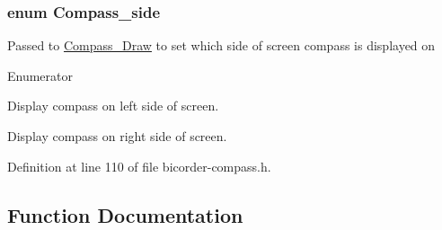 \subsubsection[{\texorpdfstring{Compass\+\_\+side}{Compass_side}}]{\setlength{\rightskip}{0pt plus 5cm}enum {\bf Compass\+\_\+side}}\hypertarget{bicorder-compass_8h_a7e36843c53aaafda9795876e659ffe7b}{}\label{bicorder-compass_8h_a7e36843c53aaafda9795876e659ffe7b}
Passed to \hyperlink{bicorder-compass_8h_a0ae721c1c17301cdf28bd0668a4f90af}{Compass\+\_\+\+Draw} to set which side of screen compass is displayed on \begin{Desc}
\item[Enumerator]\par
\begin{description}
\item[{\em 
C\+O\+M\+P\+A\+S\+S\+\_\+\+L\+E\+FT\hypertarget{bicorder-compass_8h_a7e36843c53aaafda9795876e659ffe7ba15cd36c342feb4b23e9a69bda67bcca8}{}\label{bicorder-compass_8h_a7e36843c53aaafda9795876e659ffe7ba15cd36c342feb4b23e9a69bda67bcca8}
}]Display compass on left side of screen. \item[{\em 
C\+O\+M\+P\+A\+S\+S\+\_\+\+R\+I\+G\+HT\hypertarget{bicorder-compass_8h_a7e36843c53aaafda9795876e659ffe7ba61001c6c8cf0fa674b3039da44c1b005}{}\label{bicorder-compass_8h_a7e36843c53aaafda9795876e659ffe7ba61001c6c8cf0fa674b3039da44c1b005}
}]Display compass on right side of screen. \end{description}
\end{Desc}


Definition at line 110 of file bicorder-\/compass.\+h.



\subsection{Function Documentation}

